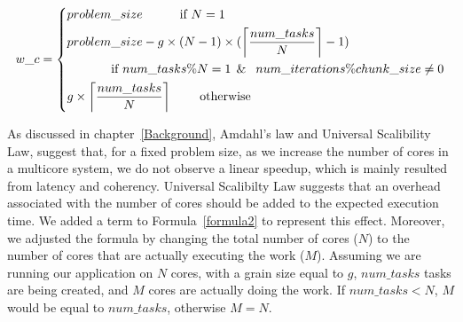 \begin{equation}\label{formula2}
w\_c =\left\{
\begin{aligned}
&problem\_{size} \:\:\:\:\:\:\:\:\:\:\:\:\text{ if } N=1\\
&problem\_{size}-g\times{(N-1)}\times(\left \lceil{\frac{num\_{tasks}}{N}}\right \rceil-1) \\
&\:\:\:\:\:\:\:\:\:\:\:\:\:\:\:\:\text{if }num\_{tasks}\%N=1\text{\:\:\&\:\: }num\_{iterations}\%chunk\_{size}\neq0\\ 
&g\times\left \lceil{\frac{num\_{tasks}}{N}}\right \rceil  \:\:\:\:\:\:\:\:\:\:    \text{otherwise}
\end{aligned}
\right.
\end{equation}

 

  




As discussed in chapter~\ref{Background}, Amdahl's law and Universal Scalibility Law, suggest that, for a fixed problem size, as we increase the number of cores in a multicore system, we do not observe a linear speedup, which is mainly resulted from latency and coherency.
Universal Scalibilty Law\cite{gunther2007guerrilla} suggests that an overhead associated with the number of cores should be added to the expected execution time. We added a term to Formula~\ref{formula2} to represent this effect. Moreover, we adjusted the formula by changing the total number of cores ($N$) to the number of cores that are actually executing the work ($M$). 
Assuming we are running our application on $N$ cores, with a grain size equal to $g$, $num\_{tasks}$ tasks are being created, and $M$ cores are actually doing the work. If $num\_{tasks}<N$, $M$ would be equal to $num\_{tasks}$, otherwise $M=N$.

